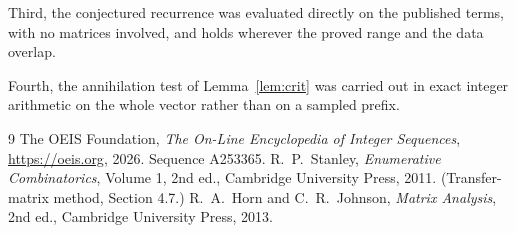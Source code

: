 \documentclass[11pt,a4paper]{article}
\theoremstyle{plain}
\theoremstyle{definition}
\begin{document}
Third, the conjectured recurrence was evaluated directly on the published terms, with no
matrices involved, and holds wherever the proved range and the data overlap.

Fourth, the annihilation test of Lemma~\ref{lem:crit} was carried out in exact integer
arithmetic on the whole vector rather than on a sampled prefix.

\begin{thebibliography}{9}
 The OEIS Foundation, \emph{The On-Line Encyclopedia of Integer
Sequences}, \url{https://oeis.org}, 2026. Sequence A253365.
 R.~P.~Stanley, \emph{Enumerative Combinatorics}, Volume 1, 2nd ed.,
Cambridge University Press, 2011. (Transfer-matrix method, Section 4.7.)
 R.~A.~Horn and C.~R.~Johnson, \emph{Matrix Analysis}, 2nd ed., Cambridge
University Press, 2013.
\end{thebibliography}
\end{document}
